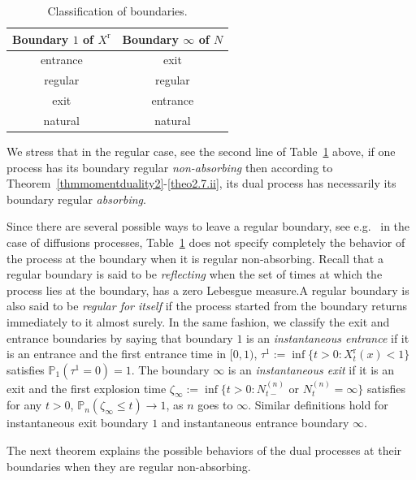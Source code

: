 \documentclass[10pt]{amsart}
\theoremstyle{definition}\newtheorem{defi}[theo]{Definition}\newtheorem{rema}[theo]{Remark}\newtheorem{exam}[theo]{Example}\newtheorem{exem}[theo]{Example}\newtheorem{nota}[theo]{Notation}
\newcommand{\rmr}{\mathrm{r}}
\newcommand{\bbP}{\mathbb{P}}
\begin{document}
\begin{table}[htpb]
\caption{Classification of boundaries.}\label{correspondance}
\begin{center}
\begin{tabular}{|c|c|}
\hline Boundary $1$ of $X^{\rmr}$ & Boundary $\infty$ of $N$\\
\hline entrance & exit \\
\hline regular & regular \\
\hline exit & entrance \\
\hline natural & natural\\
\hline
\end{tabular}
\vspace*{2mm}
\end{center}
\end{table}

We stress that in the regular case, see the second line of Table~\ref{correspondance} above, if one process has its boundary regular \emph{non-absorbing} then according to Theorem~\ref{thmmomentduality2}-\eqref{theo2.7.ii}, its dual process has necessarily its boundary regular \emph{absorbing}.

Since there are several possible ways to leave a regular boundary, see e.g.~\cite[Chapter~15, Section~8]{MR611513} in the case of diffusions processes, Table~\ref{correspondance} does not specify completely the behavior of the process at the boundary when it is regular non-absorbing. Recall that a regular boundary is said to be \emph{reflecting} when the set of times at which the process lies at the boundary, has a zero Lebesgue measure.\linebreak A regular boundary is also said to be \emph{regular for itself} if the process started from the boundary returns immediately to it almost surely. In the same fashion, we classify the exit and entrance boundaries by saying that boundary $1$ is an \emph{instantaneous entrance} if it is an entrance and the first entrance time in $[0,1)$, $\tau^{1}:=\inf\{t>0: X^{\rmr}_t(x)<1\}$ satisfies $\bbP_1(\tau^{1}=0)=1$. The boundary $\infty$ is an \emph{instantaneous exit} if it is an exit and the first explosion time $\zeta_\infty:=\inf\{t>0: N^{(n)}_{t-} \text{ or } N^{(n)}_{t}=\infty\}$ satisfies for any $t>0$, $\bbP_n(\zeta_\infty \leq t)\longrightarrow 1$, as $n$ goes to $\infty$. Similar definitions hold for instantaneous exit boundary $1$ and instantaneous entrance boundary $\infty$.

The next theorem explains the possible behaviors of the dual processes at their boundaries when they are regular non-absorbing.
\end{document}
